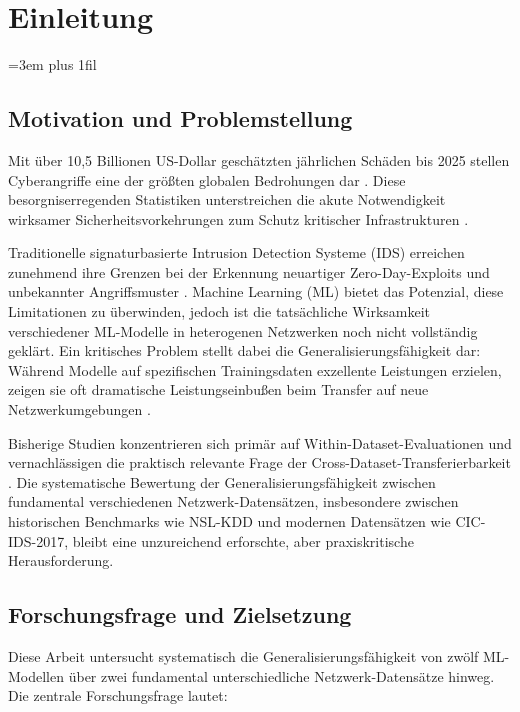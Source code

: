 \documentclass[11pt,a4paper]{article}
\begin{document}
    \section{Einleitung}
    \sloppy
    \emergencystretch=3em
    \rightskip=0pt
    \leftskip=0pt
    \parfillskip=0pt plus 1fil

    \subsection{Motivation und Problemstellung}

    Mit über 10,5 Billionen US-Dollar geschätzten jährlichen Schäden bis 2025 stellen Cyberangriffe eine der größten globalen Bedrohungen dar \parencite{GlobalRisksReport2024}. Diese besorgniserregenden Statistiken unterstreichen die akute Notwendigkeit wirksamer Sicherheitsvorkehrungen zum Schutz kritischer Infrastrukturen \parencite{Taman2024}.

    Traditionelle signaturbasierte Intrusion Detection Systeme (IDS) erreichen zunehmend ihre Grenzen bei der Erkennung neuartiger Zero-Day-Exploits und unbekannter Angriffsmuster \parencite{Ring2019,Belavagi2016}. Machine Learning (ML) bietet das Potenzial, diese Limitationen zu überwinden, jedoch ist die tatsächliche Wirksamkeit verschiedener ML-Modelle in heterogenen Netzwerken noch nicht vollständig geklärt. Ein kritisches Problem stellt dabei die Generalisierungsfähigkeit dar: Während Modelle auf spezifischen Trainingsdaten exzellente Leistungen erzielen, zeigen sie oft dramatische Leistungseinbußen beim Transfer auf neue Netzwerkumgebungen \parencite{Ring2019}.

    Bisherige Studien konzentrieren sich primär auf Within-Dataset-Evaluationen und vernachlässigen die praktisch relevante Frage der Cross-Dataset-Transferierbarkeit \parencite{Mourouzis2021}. Die systematische Bewertung der Generalisierungsfähigkeit zwischen fundamental verschiedenen Netzwerk-Datensätzen, insbesondere zwischen historischen Benchmarks wie NSL-KDD und modernen Datensätzen wie CIC-IDS-2017, bleibt eine unzureichend erforschte, aber praxiskritische Herausforderung.

    \subsection{Forschungsfrage und Zielsetzung}

    Diese Arbeit untersucht systematisch die Generalisierungsfähigkeit von zwölf ML-Modellen über zwei fundamental unterschiedliche Netzwerk-Datensätze hinweg. Die zentrale Forschungsfrage lautet:
\end{document}

